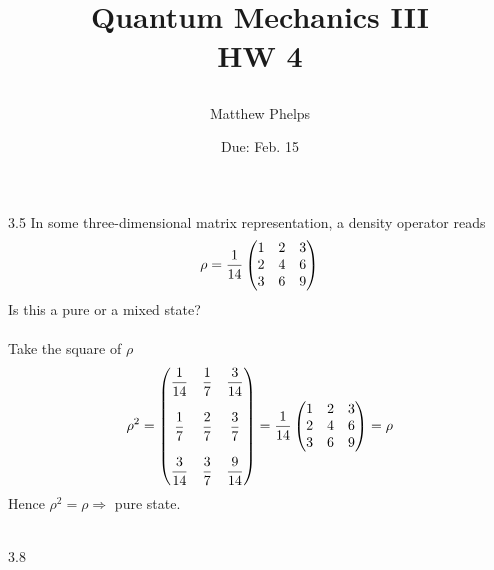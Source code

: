\documentclass[10pt,letterpaper]{article}
\title{\begin{spacing}{1.2}Quantum Mechanics III\\HW 4\end{spacing}}
\author{Matthew Phelps}
\date{Due: Feb. 15}
\begin{document}
\maketitle

\benum
  	 \item[3.5]
	In some three-dimensional matrix representation, a density operator reads
	\[
		\rho = \frac{1}{14}\begin{pmatrix} 1 & 2 & 3\\ 2 & 4 & 6 \\3 & 6& 9 \end{pmatrix}
	\]
	Is this a pure or a mixed state?
	\\ \\ 	
	Take the square of $\rho$
	\[
		\rho^2 = \begin{pmatrix} \displaystyle \frac{1}{14} &\displaystyle\frac{1}{7} &\displaystyle \frac{3}{14} \\ \\
		\displaystyle\frac{1}{7} &\displaystyle \frac{2}{7} & \displaystyle\frac{3}{7} \\ \\
		\displaystyle\frac{3}{14} & \displaystyle\frac{3}{7} & \displaystyle\frac{9}{14}\end{pmatrix}
		= \frac{1}{14}\begin{pmatrix} 1 & 2 & 3\\ 2 & 4 & 6 \\3 & 6& 9 \end{pmatrix}
		=\rho
	\]
	Hence $\rho^2 = \rho \Rightarrow$ pure state. \\ \\
	\item[3.8]
	
\end{document}
